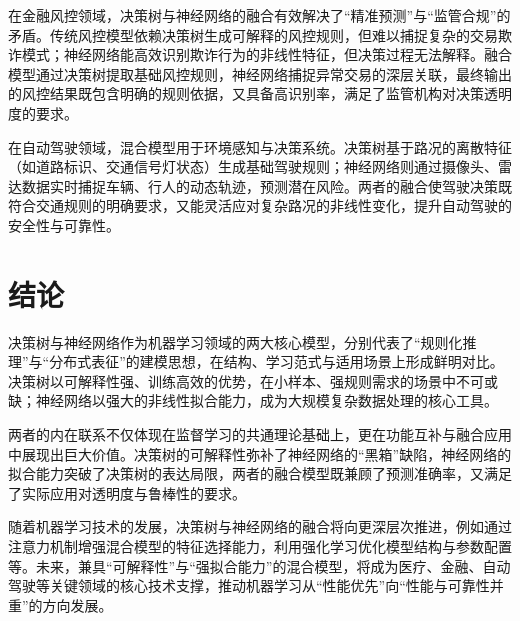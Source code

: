 在金融风控领域，决策树与神经网络的融合有效解决了“精准预测”与“监管合规”的矛盾。传统风控模型依赖决策树生成可解释的风控规则，但难以捕捉复杂的交易欺诈模式；神经网络能高效识别欺诈行为的非线性特征，但决策过程无法解释。融合模型通过决策树提取基础风控规则，神经网络捕捉异常交易的深层关联，最终输出的风控结果既包含明确的规则依据，又具备高识别率，满足了监管机构对决策透明度的要求。

在自动驾驶领域，混合模型用于环境感知与决策系统。决策树基于路况的离散特征（如道路标识、交通信号灯状态）生成基础驾驶规则；神经网络则通过摄像头、雷达数据实时捕捉车辆、行人的动态轨迹，预测潜在风险。两者的融合使驾驶决策既符合交通规则的明确要求，又能灵活应对复杂路况的非线性变化，提升自动驾驶的安全性与可靠性。

\section*{结论}
决策树与神经网络作为机器学习领域的两大核心模型，分别代表了“规则化推理”与“分布式表征”的建模思想，在结构、学习范式与适用场景上形成鲜明对比。决策树以可解释性强、训练高效的优势，在小样本、强规则需求的场景中不可或缺；神经网络以强大的非线性拟合能力，成为大规模复杂数据处理的核心工具。

两者的内在联系不仅体现在监督学习的共通理论基础上，更在功能互补与融合应用中展现出巨大价值。决策树的可解释性弥补了神经网络的“黑箱”缺陷，神经网络的拟合能力突破了决策树的表达局限，两者的融合模型既兼顾了预测准确率，又满足了实际应用对透明度与鲁棒性的要求。

随着机器学习技术的发展，决策树与神经网络的融合将向更深层次推进，例如通过注意力机制增强混合模型的特征选择能力，利用强化学习优化模型结构与参数配置等。未来，兼具“可解释性”与“强拟合能力”的混合模型，将成为医疗、金融、自动驾驶等关键领域的核心技术支撑，推动机器学习从“性能优先”向“性能与可靠性并重”的方向发展。








